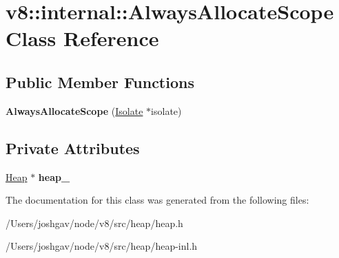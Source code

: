 \hypertarget{classv8_1_1internal_1_1_always_allocate_scope}{}\section{v8\+:\+:internal\+:\+:Always\+Allocate\+Scope Class Reference}
\label{classv8_1_1internal_1_1_always_allocate_scope}
\subsection*{Public Member Functions}
\begin{DoxyCompactItemize}
\item 
{\bfseries Always\+Allocate\+Scope} (\hyperlink{classv8_1_1internal_1_1_isolate}{Isolate} $\ast$isolate)\hypertarget{classv8_1_1internal_1_1_always_allocate_scope_a34c521892b9b7d7b65feb1c9e56bddf0}{}\label{classv8_1_1internal_1_1_always_allocate_scope_a34c521892b9b7d7b65feb1c9e56bddf0}

\end{DoxyCompactItemize}
\subsection*{Private Attributes}
\begin{DoxyCompactItemize}
\item 
\hyperlink{classv8_1_1internal_1_1_heap}{Heap} $\ast$ {\bfseries heap\+\_\+}\hypertarget{classv8_1_1internal_1_1_always_allocate_scope_af71f11b2b6a94288793f8ef48083c72a}{}\label{classv8_1_1internal_1_1_always_allocate_scope_af71f11b2b6a94288793f8ef48083c72a}

\end{DoxyCompactItemize}


The documentation for this class was generated from the following files\+:\begin{DoxyCompactItemize}
\item 
/\+Users/joshgav/node/v8/src/heap/heap.\+h\item 
/\+Users/joshgav/node/v8/src/heap/heap-\/inl.\+h\end{DoxyCompactItemize}
